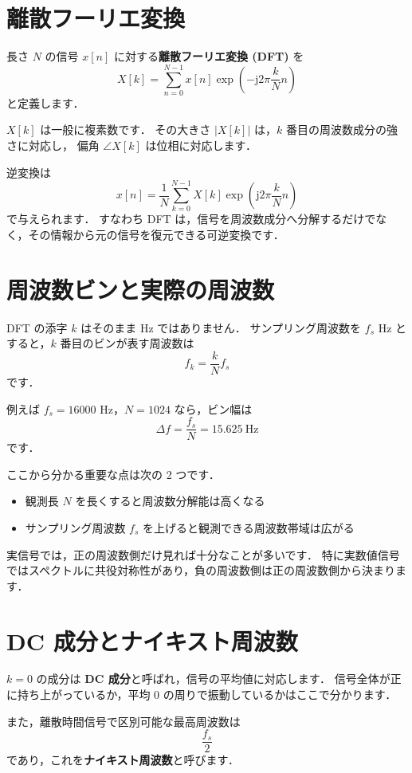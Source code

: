 \section{離散フーリエ変換}

長さ $N$ の信号 $x[n]$ に対する\textbf{離散フーリエ変換 (DFT)} を
\[
X[k] = \sum_{n=0}^{N-1} x[n] \exp\left(-\mathrm{j}2\pi \frac{k}{N} n\right)
\]
と定義します．

$X[k]$ は一般に複素数です．
その大きさ $|X[k]|$ は，$k$ 番目の周波数成分の強さに対応し，
偏角 $\angle X[k]$ は位相に対応します．

逆変換は
\[
x[n] = \frac{1}{N}\sum_{k=0}^{N-1} X[k] \exp\left(\mathrm{j}2\pi \frac{k}{N} n\right)
\]
で与えられます．
すなわち DFT は，信号を周波数成分へ分解するだけでなく，その情報から元の信号を復元できる可逆変換です．


\section{周波数ビンと実際の周波数}

DFT の添字 $k$ はそのまま Hz ではありません．
サンプリング周波数を $f_s$ Hz とすると，$k$ 番目のビンが表す周波数は
\[
f_k = \frac{k}{N} f_s
\]
です．

例えば $f_s = 16000$ Hz，$N = 1024$ なら，ビン幅は
\[
\Delta f = \frac{f_s}{N} = 15.625 \ \mathrm{Hz}
\]
です．

ここから分かる重要な点は次の 2 つです．
\begin{itemize}
\item 観測長 $N$ を長くすると周波数分解能は高くなる
\item サンプリング周波数 $f_s$ を上げると観測できる周波数帯域は広がる
\end{itemize}

実信号では，正の周波数側だけ見れば十分なことが多いです．
特に実数値信号ではスペクトルに共役対称性があり，負の周波数側は正の周波数側から決まります．


\section{DC 成分とナイキスト周波数}

$k=0$ の成分は \textbf{DC 成分}と呼ばれ，信号の平均値に対応します．
信号全体が正に持ち上がっているか，平均 0 の周りで振動しているかはここで分かります．

また，離散時間信号で区別可能な最高周波数は
\[
\frac{f_s}{2}
\]
であり，これを\textbf{ナイキスト周波数}と呼びます．

